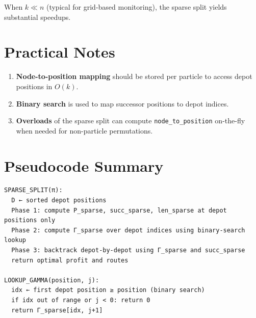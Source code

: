 \documentclass[11pt]{article}
\theoremstyle{definition}
\begin{document}
When $k \ll n$ (typical for grid-based monitoring), the sparse split yields substantial speedups.

\section{Practical Notes}

\begin{enumerate}[nosep]
  \item \textbf{Node-to-position mapping} should be stored per particle to access depot positions in $O(k)$.
  \item \textbf{Binary search} is used to map successor positions to depot indices.
  \item \textbf{Overloads} of the sparse split can compute \texttt{node\_to\_position} on-the-fly when needed for non-particle permutations.
\end{enumerate}

\appendix

\section{Pseudocode Summary}

\begin{lstlisting}[basicstyle=\ttfamily, frame=single]
SPARSE_SPLIT(π):
  D ← sorted depot positions
  Phase 1: compute P_sparse, succ_sparse, len_sparse at depot positions only
  Phase 2: compute Γ_sparse over depot indices using binary-search lookup
  Phase 3: backtrack depot-by-depot using Γ_sparse and succ_sparse
  return optimal profit and routes

LOOKUP_GAMMA(position, j):
  idx ← first depot position ≥ position (binary search)
  if idx out of range or j < 0: return 0
  return Γ_sparse[idx, j+1]
\end{lstlisting}
\end{document}
